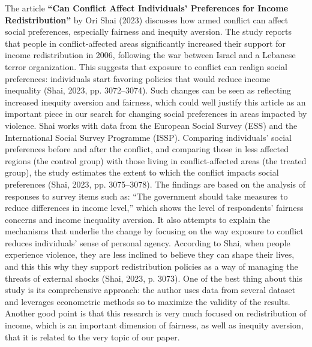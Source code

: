 \documentclass[14pt]{article}
\theoremstyle{remark}
\begin{document}
The article \textbf{``Can Conflict Affect Individuals' Preferences for Income Redistribution''} by Ori Shai (2023) discusses how armed conflict can affect social preferences, especially fairness and inequity aversion. The study reports that people in conflict-affected areas significantly increased their support for income redistribution in 2006, following the war between Israel and a Lebanese terror organization. This suggests that exposure to conflict can realign social preferences: individuals start favoring policies that would reduce income inequality (Shai, 2023, pp. 3072--3074). Such changes can be seen as reflecting increased inequity aversion and fairness, which could well justify this article as an important piece in our search for changing social preferences in areas impacted by violence. Shai works with data from the European Social Survey (ESS) and the International Social Survey Programme (ISSP). Comparing individuals' social preferences before and after the conflict, and comparing those in less affected regions (the control group) with those living in conflict-affected areas (the treated group), the study estimates the extent to which the conflict impacts social preferences (Shai, 2023, pp. 3075--3078). The findings are based on the analysis of responses to survey items such as: ``The government should take measures to reduce differences in income level,'' which shows the level of respondents' fairness concerns and income inequality aversion. It also attempts to explain the mechanisms that underlie the change by focusing on the way exposure to conflict reduces individuals' sense of personal agency. According to Shai, when people experience violence, they are less inclined to believe they can shape their lives, and this this why they support redistribution policies as a way of managing the threats of external shocks (Shai, 2023, p. 3073). One of the best thing about this study is its comprehensive approach: the author uses data from several dataset and leverages econometric methods so to maximize the validity of the results. Another good point is that this research is very much focused on redistribution of income, which is an important dimension of fairness, as well as inequity aversion, that it is related to the very topic of our paper.
\end{document}
